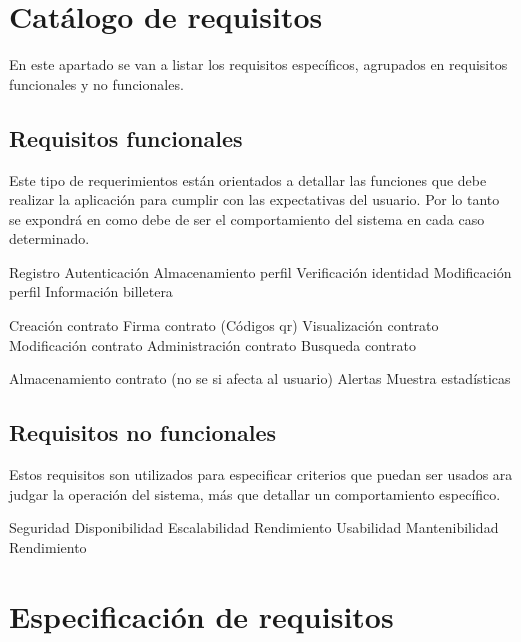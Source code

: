 \section{Catálogo de requisitos}

En este apartado se van a listar los requisitos específicos, agrupados en requisitos funcionales y no funcionales.


\subsection{Requisitos funcionales}

Este tipo de requerimientos están orientados a detallar las funciones que debe realizar la aplicación para cumplir con las expectativas del usuario. Por lo tanto se expondrá en como debe de ser el comportamiento del sistema en cada caso determinado.


Registro
Autenticación
Almacenamiento perfil
Verificación identidad
Modificación perfil
Información billetera

Creación contrato
Firma contrato (Códigos qr)
Visualización contrato
Modificación contrato
Administración contrato
Busqueda contrato

Almacenamiento contrato (no se si afecta al usuario)
Alertas
Muestra estadísticas


\subsection{Requisitos no funcionales}

Estos requisitos son utilizados para especificar criterios que puedan ser usados ara judgar la operación del sistema, más que detallar un comportamiento específico.

Seguridad
Disponibilidad
Escalabilidad
Rendimiento
Usabilidad
Mantenibilidad
Rendimiento



\section{Especificación de requisitos}





